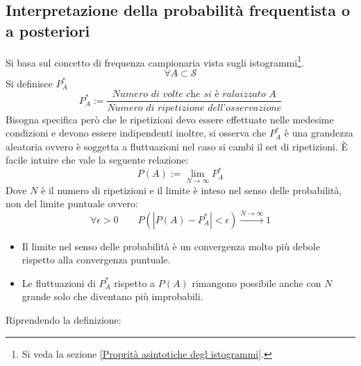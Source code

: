\documentclass[11pt,a4paper]{book}
\begin{document}
\subsection{Interpretazione della probabilità frequentista o a posteriori} 
Si basa sul concetto di frequenza campionaria vista sugli istogrammi\footnote{Si veda la sezione \ref{Proprità asintotiche degl istogrammi}.}.
\begin{equation}
\forall A \subset \mathcal{S}
\end{equation}
Si definisce $ P^*_A $ 
\begin{equation}
P^*_A := \frac{\textit{Numero di volte che si è ralaizzato A}}{\textit{Numero di ripetizione dell'osservazione}}
\end{equation}
Bisogna specifica però che le ripetizioni devo essere effettuate nelle medesime condizioni e devono essere indipendenti inoltre, si osserva che $ P^*_A $ è una grandezza aleatoria ovvero è soggetta a fluttuazioni nel caso si cambi il set di ripetizioni. \`{E} facile intuire che vale la seguente relazione:
\begin{equation}
P(A) := \lim\limits_{N \to \infty} P^*_A
\end{equation}
Dove $ N $ è il numero di ripetizioni e il limite è inteso nel senso delle probabilità, non del limite puntuale ovvero:
\begin{equation}
\forall \epsilon > 0 \qquad P\left(\left|P(A)-P_A^* \right| < \epsilon \right) \xrightarrow{N \to \infty} 1
\end{equation}
\begin{itemize}
\item Il limite nel senso delle probabilità è un convergenza molto più debole rispetto alla convergenza puntuale.
\item Le fluttuazioni di $ P^*_A $ rispetto a $ P(A) $ rimangono possibile anche con $ N $ grande solo che diventano più improbabili.
\end{itemize}
Riprendendo la definizione:
\end{document}
